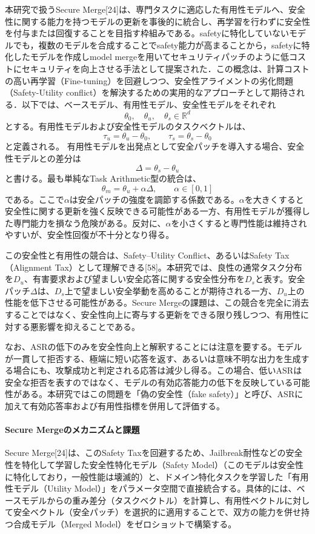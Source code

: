 \documentclass{article}
\begin{document}
本研究で扱うSecure Merge[24]は、専門タスクに適応した有用性モデルへ、安全性に関する能力を持つモデルの更新を事後的に統合し、再学習を行わずに安全性を付与または回復することを目指す枠組みである。safetyに特化していないモデルでも，複数のモデルを合成することでsafety能力が高まることから，safetyに特化したモデルを作成しmodel mergeを用いてセキュリティパッチのように低コストにセキュリティを向上させる手法として提案された．この概念は、計算コストの高い再学習（Fine-tuning）を回避しつつ、安全性アライメントの劣化問題（Safety-Utility conflict）を解決するための実用的なアプローチとして期待される．以下では、ベースモデル、有用性モデル、安全性モデルをそれぞれ
\[
\theta_0,\quad \theta_u,\quad \theta_s \in \mathbb{R}^d
\]
とする。有用性モデルおよび安全性モデルのタスクベクトルは、
\[
\tau_u = \theta_u - \theta_0,\qquad
\tau_s = \theta_s - \theta_0
\]
と定義される。
有用性モデルを出発点として安全パッチを導入する場合、安全性モデルとの差分は
\[
\Delta = \theta_s - \theta_u
\]
と書ける。最も単純なTask Arithmetic型の統合は、
\[
\theta_m = \theta_u + \alpha \Delta,\qquad \alpha \in [0,1]
\]
である。ここで\(\alpha\)は安全パッチの強度を調節する係数である。\(\alpha\)を大きくすると安全性に関する更新を強く反映できる可能性がある一方、有用性モデルが獲得した専門能力を損なう危険がある。反対に、\(\alpha\)を小さくすると専門性能は維持されやすいが、安全性回復が不十分となり得る。

この安全性と有用性の競合は、Safety--Utility Conflict、あるいはSafety Tax（Alignment Tax）として理解できる[58]。本研究では、良性の通常タスク分布を\(D_u\)、有害要求および望ましい安全応答に関する安全性分布を\(D_s\)と表す。安全パッチ\(\Delta\)は、\(D_s\)上で望ましい安全挙動を高めることが期待される一方、\(D_u\)上の性能を低下させる可能性がある。Secure Mergeの課題は、この競合を完全に消去することではなく、安全性向上に寄与する更新をできる限り残しつつ、有用性に対する悪影響を抑えることである。

なお、ASRの低下のみを安全性向上と解釈することには注意を要する。モデルが一貫して拒否する、極端に短い応答を返す、あるいは意味不明な出力を生成する場合にも、攻撃成功と判定される応答は減少し得る。この場合、低いASRは安全な拒否を表すのではなく、モデルの有効応答能力の低下を反映している可能性がある。本研究ではこの問題を「偽の安全性（fake safety）」と呼び、ASRに加えて有効応答率および有用性指標を併用して評価する。

\paragraph{Secure Mergeのメカニズムと課題}
Secure Merge[24]は、このSafety Taxを回避するため、Jailbreak耐性などの安全性を特化して学習した安全性特化モデル（Safety Model）（このモデルは安全性に特化しており，一般性能は壊滅的）と、ドメイン特化タスクを学習した「有用性モデル（Utility Model）」をパラメータ空間で直接統合する。具体的には、ベースモデルからの重み差分（タスクベクトル）を計算し、有用性ベクトルに対して安全ベクトル（安全パッチ）を選択的に適用することで、双方の能力を併せ持つ合成モデル（Merged Model）をゼロショットで構築する。
\end{document}
